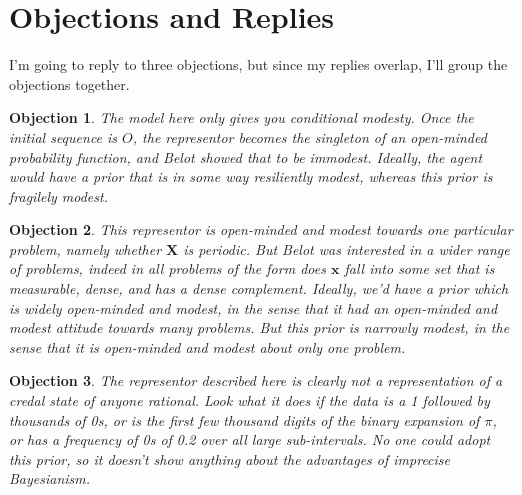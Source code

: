 \documentclass{ergoclass}
\newtheorem{objection}{Objection}
\newcommand{\vx}{\boldsymbol{x}}
\newcommand{\vX}{\boldsymbol{X}}
\begin{document}
\section{Objections and Replies}
I'm going to reply to three objections, but since my replies overlap, I'll group the objections together.

\begin{objection}
The model here only gives you conditional modesty. Once the initial sequence is $O$, the representor becomes the singleton of an open-minded probability function, and Belot showed that to be immodest. Ideally, the agent would have a prior that is in some way resiliently modest, whereas this prior is fragilely modest.
\end{objection}

\begin{objection}
This representor is open-minded and modest towards one particular problem, namely whether $\vX$ is periodic. But Belot was interested in a wider range of problems, indeed in all problems of the form 
\textnormal{does $\vx$ fall into some set that is measurable, dense, and has a dense complement}. %
Ideally, we'd have a prior which is widely open-minded and modest, in the sense that it had an open-minded and modest attitude towards many problems. But this prior is narrowly modest, in the sense that it is open-minded and modest about only one problem.
\end{objection}

\begin{objection}
The representor described here is clearly not a representation of a credal state of anyone rational. Look what it does if the data is a 1 followed by thousands of 0s, or is the first few thousand digits of the binary expansion of $\pi$, or has a frequency of 0s of 0.2 over all large sub-intervals. No one could adopt this prior, so it doesn't show anything about the advantages of imprecise Bayesianism.
\end{objection}
\end{document}
